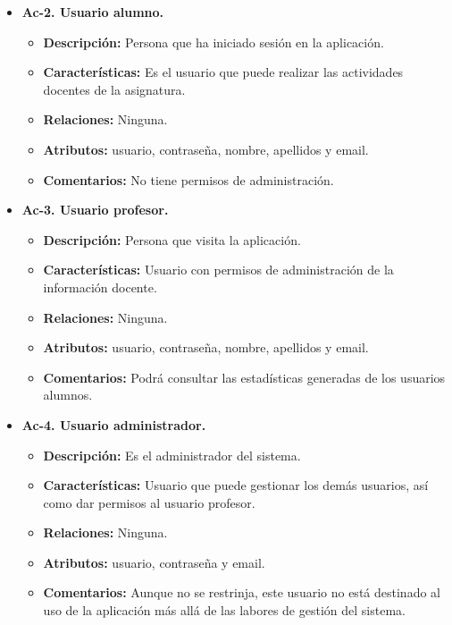 \begin{itemize}
  \item \textbf{Ac-2. Usuario alumno.}
  \begin{itemize}
   \item \textbf{Descripción:} Persona que ha iniciado sesión en la aplicación.
   \item \textbf{Características:} Es el usuario que puede realizar las actividades docentes de la asignatura.
   \item \textbf{Relaciones:} Ninguna.
   \item \textbf{Atributos:} usuario, contraseña, nombre, apellidos y email.
   \item \textbf{Comentarios:} No tiene permisos de administración.
  \end{itemize}
\end{itemize}

\begin{itemize}
  \item \textbf{Ac-3. Usuario profesor.}
  \begin{itemize}
   \item \textbf{Descripción:} Persona que visita la aplicación.
   \item \textbf{Características:} Usuario con permisos de administración de la información docente.
   \item \textbf{Relaciones:} Ninguna.
   \item \textbf{Atributos:} usuario, contraseña, nombre, apellidos y email.
   \item \textbf{Comentarios:} Podrá consultar las estadísticas generadas de los usuarios alumnos.
  \end{itemize}
\end{itemize}

\begin{itemize}
  \item \textbf{Ac-4. Usuario administrador.}
  \begin{itemize}
   \item \textbf{Descripción:} Es el administrador del sistema.
   \item \textbf{Características:} Usuario que puede gestionar los demás usuarios, así como dar permisos al usuario profesor.
   \item \textbf{Relaciones:} Ninguna.
   \item \textbf{Atributos:} usuario, contraseña y email.
   \item \textbf{Comentarios:} Aunque no se restrinja, este usuario no está destinado al uso de la aplicación más allá de las labores de gestión del sistema.
  \end{itemize}
\end{itemize}


